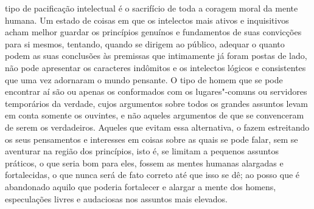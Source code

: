 tipo de pacificação intelectual é o sacrifício de toda a coragem moral
da mente humana. Um estado de coisas em que os intelectos mais ativos
e inquisitivos acham melhor guardar os princípios genuínos e
fundamentos de suas convicções para si mesmos, tentando, quando se
dirigem ao público, adequar o quanto podem as suas conclusões às
premissas que intimamente já foram postas de lado, não pode apresentar
os caracteres indômitos e os intelectos lógicos e consistentes que uma
vez adornaram o mundo pensante. O tipo de homem que se pode encontrar
aí são ou apenas os conformados com os lugares"-comuns ou servidores
temporários da verdade, cujos argumentos sobre todos os grandes assuntos
levam em conta somente os ouvintes, e não aqueles argumentos de que se
convenceram de serem os verdadeiros. Aqueles que evitam essa
alternativa, o fazem estreitando os seus pensamentos e interesses em
coisas sobre as quais se pode falar, sem se aventurar na região dos
princípios, isto é, se limitam a pequenos assuntos práticos, o que
seria bom para eles, fossem as mentes humanas alargadas e
fortalecidas, o que nunca será de fato correto até que isso se dê;
ao posso que é abandonado aquilo que poderia fortalecer e alargar a mente dos
homens, especulações livres e audaciosas nos assuntos mais elevados. 

